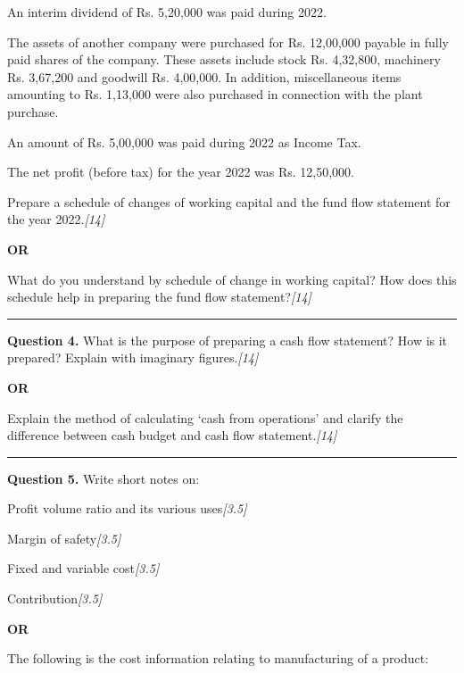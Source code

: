 \documentclass[11pt,a4paper]{article}
\newcommand{\pts}[1]{\hfill   \textit{[#1]}}
\begin{document}
\begin{parts}
  \item An interim dividend of Rs. 5,20,000 was paid during 2022.
  \item The assets of another company were purchased for Rs. 12,00,000 payable in fully paid shares of the company. These assets include stock Rs. 4,32,800, machinery Rs. 3,67,200 and goodwill Rs. 4,00,000. In addition, miscellaneous items amounting to Rs. 1,13,000 were also purchased in connection with the plant purchase.
  \item An amount of Rs. 5,00,000 was paid during 2022 as Income Tax.
  \item The net profit (before tax) for the year 2022 was Rs. 12,50,000.
\end{parts}
Prepare a schedule of changes of working capital and the fund flow statement for the year 2022.\pts{14}

\centerline{   \textbf{OR}}

What do you understand by schedule of change in working capital? How does this schedule help in preparing the fund flow statement?\pts{14}

\medskip\rule{\linewidth}{0.2pt}




\noindent   \textbf{Question 4.}
What is the purpose of preparing a cash flow statement? How is it prepared? Explain with imaginary figures.\pts{14}

\centerline{   \textbf{OR}}

Explain the method of calculating `cash from operations' and clarify the difference between cash budget and cash flow statement.\pts{14}

\medskip\rule{\linewidth}{0.2pt}




\noindent   \textbf{Question 5.}
Write short notes on:

\begin{parts}
  \item Profit volume ratio and its various uses\pts{3.5}
  \item Margin of safety\pts{3.5}
  \item Fixed and variable cost\pts{3.5}
  \item Contribution\pts{3.5}
\end{parts}

\centerline{   \textbf{OR}}

The following is the cost information relating to manufacturing of a product:
\end{document}
